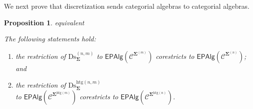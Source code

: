 \documentclass[a4paper, reqno]{amsbook}
\makeatletter
\newcommand{\sig}[1]{\mathbf{#1}}             %
\newcommand{\spec}[1]{\boldsymbol{\mathcal{#1}}} %
\newcommand{\htg}{\mathrm{htg}}                %
\newcommand{\Ds}{\mathrm{Ds}}
\theoremstyle{plain}
\newtheorem{proposition}[theorem]{Proposition}
\theoremstyle{definition}
\newcommand*{\CA@leanpending}{}
\newcommand*{\CA@leanrelation}{}
\newcommand*{\lean}[2]{%
  \ifcsname\string\color@lean@#1\endcsname\else
    \PackageError{main}{Unknown relation `#1' in \string\lean}{Use equivalent, weaker or stronger.}%
  \fi
  \gdef\CA@leanrelation{#1}%
  \gdef\CA@leanpending{#2}}
\makeatother
\begin{document}
We next prove that discretization sends categorial algebras to categorial algebras.

\begin{proposition}\label{PDsEpVariety}\lean{equivalent}{Dimensions.homogeneousDiscretization_isModel,Dimensions.heterogeneousDiscretization_isModel}
The following statements hold:
\begin{enumerate}
\item the restriction of $\Ds^{(n,m)}_{\sig{\Sigma}}$ to $\mathsf{EPAlg}(\spec{C}^{\sig{\Sigma}^{(m)}})$ corestricts to $\mathsf{EPAlg}(\spec{C}^{\sig{\Sigma}^{(n)}})$; and
\item the restriction of $\Ds^{\htg(n,m)}_{\sig{\Sigma}}$\\ to $\mathsf{EPAlg}(\spec{C}^{\sig{\Sigma}^{\htg(m)}})$ corestricts to $\mathsf{EPAlg}(\spec{C}^{\sig{\Sigma}^{\htg(n)}})$.
\end{enumerate}
\end{proposition}
\end{document}
